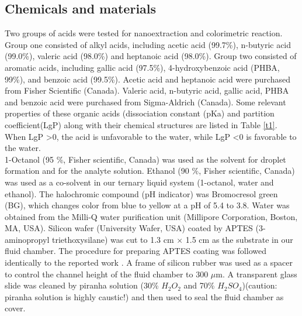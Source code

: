 \documentclass[journal=langd5,manuscript=article]{achemso}
\begin{document}
\subsection{Chemicals and materials}  
Two groups of acids were tested for nanoextraction and colorimetric reaction. Group one consisted of alkyl acids, including acetic acid (99.7\%), n-butyric acid (99.0\%), valeric acid (98.0\%) and heptanoic acid (98.0\%). Group two consisted of aromatic acids, including gallic acid (97.5\%), 4-hydroxybenzoic acid (PHBA, 99\%), and benzoic acid (99.5\%). Acetic acid and heptanoic acid were purchased from Fisher Scientific (Canada). Valeric acid, n-butyric acid, gallic acid, PHBA and benzoic acid were purchased from Sigma-Aldrich (Canada). Some relevant properties of these organic acids (dissociation constant (pKa) and partition coefficient(LgP) along with their chemical structures are listed in Table \ref{t1}. When LgP \textgreater 0, the acid is unfavorable to the water, while LgP \textless 0 is favorable to the water.\\ 
1-Octanol (95 $\%$, Fisher scientific, Canada) was used as the solvent for droplet formation and for the analyte solution. Ethanol (90 $\%$, Fisher scientific, Canada) was used as a co-solvent in our ternary liquid system (1-octanol, water and ethanol). The halochromic compound (pH indicator) was Bromocresol green (BG), which changes color from blue to yellow at a pH of 5.4 to 3.8. Water was obtained from the Milli-Q water purification unit (Millipore Corporation, Boston, MA, USA).  Silicon wafer (University Wafer, USA) coated by APTES (3-aminopropyl triethoxysilane) was cut to 1.3 cm $\times$ 1.5 cm as the substrate in our fluid chamber. The procedure for preparing APTES coating was followed identically to the reported work \cite{APTES1}. A frame of silicon rubber was used as a spacer to control the channel height of the fluid chamber to 300 $\mu$m. A transparent glass slide was cleaned by piranha solution (30\% $H_2O_2$ and 70\% $H_2SO_4$)(caution: piranha solution is highly caustic!) and then used to seal the fluid chamber as cover.
\end{document}
